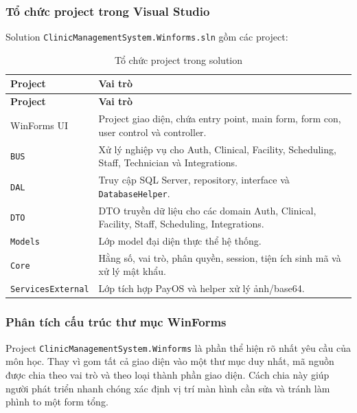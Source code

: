 \documentclass[12pt,a4paper]{article}
\numberwithin{figure}{subsection}
\numberwithin{table}{subsection}
\begin{document}
\subsubsection{Tổ chức project trong Visual Studio}

Solution \texttt{ClinicManagementSystem.Winforms.sln} gồm các project:

\begin{longtable}{|p{4cm}|p{9.8cm}|}
\caption{Tổ chức project trong solution} \\
\hline
\textbf{Project} & \textbf{Vai trò} \\
\hline
\endfirsthead
\hline
\textbf{Project} & \textbf{Vai trò} \\
\hline
\endhead
WinForms UI & Project giao diện, chứa entry point, main form, form con, user control và controller. \\
\hline
\texttt{BUS} & Xử lý nghiệp vụ cho Auth, Clinical, Facility, Scheduling, Staff, Technician và Integrations. \\
\hline
\texttt{DAL} & Truy cập SQL Server, repository, interface và \texttt{DatabaseHelper}. \\
\hline
\texttt{DTO} & DTO truyền dữ liệu cho các domain Auth, Clinical, Facility, Staff, Scheduling, Integrations. \\
\hline
\texttt{Models} & Lớp model đại diện thực thể hệ thống. \\
\hline
\texttt{Core} & Hằng số, vai trò, phân quyền, session, tiện ích sinh mã và xử lý mật khẩu. \\
\hline
\texttt{ServicesExternal} & Lớp tích hợp PayOS và helper xử lý ảnh/base64. \\
\hline
\end{longtable}

\subsubsection{Phân tích cấu trúc thư mục WinForms}

Project \texttt{ClinicManagementSystem.Winforms} là phần thể hiện rõ nhất yêu cầu của môn học. Thay vì gom tất cả giao diện vào một thư mục duy nhất, mã nguồn được chia theo vai trò và theo loại thành phần giao diện. Cách chia này giúp người phát triển nhanh chóng xác định vị trí màn hình cần sửa và tránh làm phình to một form tổng.
\end{document}
